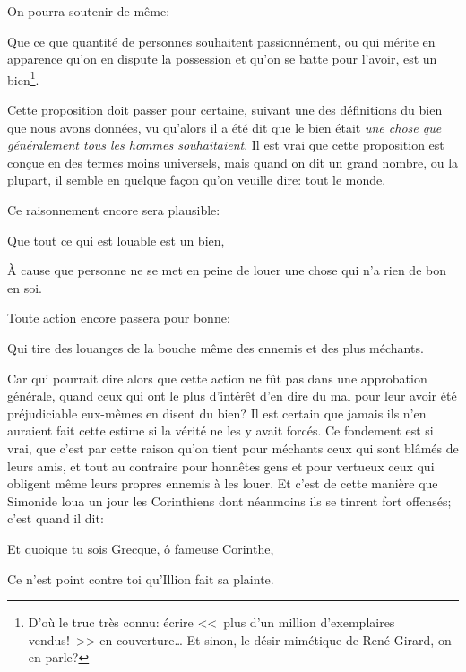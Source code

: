 \bigbreak

On pourra soutenir de même:

\begin{emphpar}
	Que ce que quantité de personnes souhaitent passionnément, ou qui mérite en apparence qu'on en dispute la
	possession et qu'on se batte pour l'avoir, est un bien\footnote{D'où le truc très connu: écrire <<~plus d'un
	million d'exemplaires vendus!~>> en couverture\dots{} Et sinon, le désir mimétique de René Girard, on en
	parle?}.
\end{emphpar}

Cette proposition doit passer pour certaine, suivant une des définitions du bien que nous avons données, vu qu'alors
il a été dit que le bien était \emph{une chose que généralement tous les hommes souhaitaient}. Il est vrai que cette
proposition est conçue en des termes moins universels, mais quand on dit un grand nombre, ou la plupart, il semble en
quelque façon qu'on veuille dire: tout le monde.

\bigbreak

Ce raisonnement encore sera plausible:

\begin{emphpar}
	Que tout ce qui est louable est un bien,
\end{emphpar}

À cause que personne ne se met en peine de louer une chose qui n'a rien de bon en soi. 

\bigbreak

Toute action encore passera pour bonne:

\begin{emphpar}
	Qui tire des louanges de la bouche même des ennemis et des plus méchants.
\end{emphpar}

Car qui pourrait dire alors que cette action ne fût pas dans une approbation générale, quand ceux qui ont le plus d'intérêt
d'en dire du mal pour leur avoir été préjudiciable eux-mêmes en disent du bien? Il est certain que jamais ils n'en auraient
fait cette estime si la vérité ne les y avait forcés. Ce fondement est si vrai, que c'est par cette raison qu'on tient pour
méchants ceux qui sont blâmés de leurs amis, et tout au contraire pour honnêtes gens et pour vertueux ceux qui obligent même
leurs propres ennemis à les louer. Et c'est de cette manière que Simonide loua un jour les Corinthiens dont néanmoins ils se
tinrent fort offensés; c'est quand il dit:

\begin{emphpar}
	Et quoique tu sois Grecque, ô fameuse Corinthe,
	
	Ce n'est point contre toi qu'Illion fait sa plainte.
\end{emphpar}

